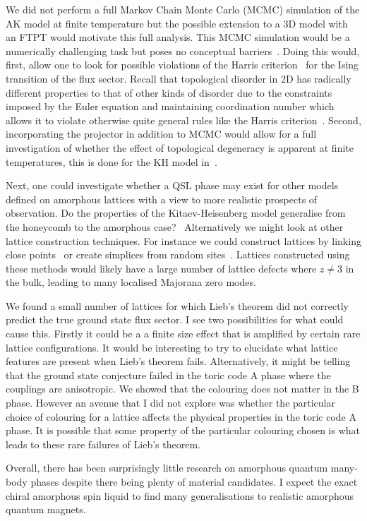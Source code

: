 We did not perform a full Markov Chain Monte Carlo (MCMC) simulation of the AK model at finite temperature but the possible extension to a 3D model with an FTPT would motivate this full analysis. This MCMC simulation would be a numerically challenging task but poses no conceptual barriers~\autocite{Laumann2012,lahtinenTopologicalLiquidNucleation2012,selfThermallyInducedMetallic2019}. Doing this would, first, allow one to look for possible violations of the Harris criterion~\autocite{harrisEffectRandomDefects1974} for the Ising transition of the flux sector. Recall that topological disorder in 2D has radically different properties to that of other kinds of disorder due to the constraints imposed by the Euler equation and maintaining coordination number which allows it to violate otherwise quite general rules like the Harris criterion~\autocite{barghathiPhaseTransitionsRandom2014,schrauthViolationHarrisBarghathiVojtaCriterion2018}. Second, incorporating the projector in addition to MCMC would allow for a full investigation of whether the effect of topological degeneracy is apparent at finite temperatures, this is done for the KH model in~\autocite{selfThermallyInducedMetallic2019}.

Next, one could investigate whether a QSL phase may exist for other models defined on amorphous lattices with a view to more realistic prospects of observation. Do the properties of the Kitaev-Heisenberg model generalise from the honeycomb to the amorphous case?~\autocite{Chaloupka2010,Chaloupka2015,Jackeli2009,Kalmeyer1989,manousakisSpinTextonehalfHeisenberg1991} Alternatively we might look at other lattice construction techniques. For instance we could construct lattices by linking close points~\autocite{agarwala2019topological} or create simplices from random sites~\autocite{christRandomLatticeField1982}. Lattices constructed using these methods would likely have a large number of lattice defects where \(z \neq 3\) in the bulk, leading to many localised Majorana zero modes.

We found a small number of lattices for which Lieb's theorem did not correctly predict the true ground state flux sector. I see two possibilities for what could cause this. Firstly it could be a a finite size effect that is amplified by certain rare lattice configurations. It would be interesting to try to elucidate what lattice features are present when Lieb's theorem fails. Alternatively, it might be telling that the ground state conjecture failed in the toric code A phase where the couplings are anisotropic. We showed that the colouring does not matter in the B phase. However an avenue that I did not explore was whether the particular choice of colouring for a lattice affects the physical properties in the toric code A phase. It is possible that some property of the particular colouring chosen is what leads to these rare failures of Lieb's theorem.

Overall, there has been surprisingly little research on amorphous quantum many-body phases despite there being plenty of material candidates. I expect the exact chiral amorphous spin liquid to find many generalisations to realistic amorphous quantum magnets.
